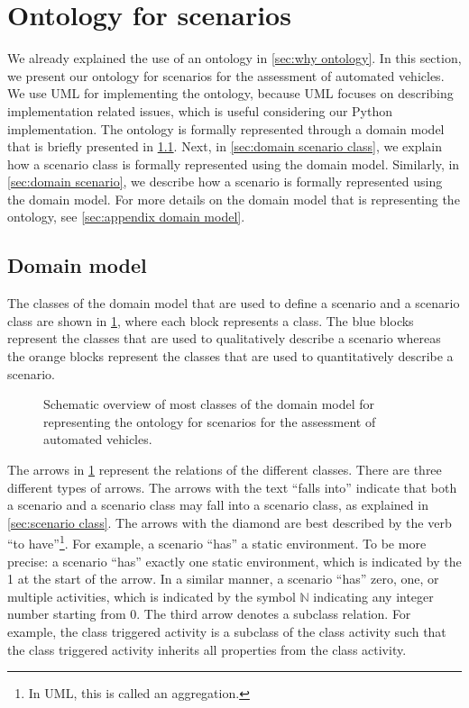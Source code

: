\section{Ontology for scenarios}
\label{sec:ontology}

We already explained the use of an ontology in \cref{sec:why ontology}. In this section, we present our ontology for scenarios for the assessment of automated vehicles. 
We use UML for implementing the ontology, because UML focuses on describing implementation related issues, which is useful considering our Python implementation.
The ontology is formally represented through a domain model that is briefly presented in \cref{sec:domain model}. Next, in \cref{sec:domain scenario class}, we explain how a scenario class is formally represented using the domain model. Similarly, in \cref{sec:domain scenario}, we describe how a scenario is formally represented using the domain model. For more details on the domain model that is representing the ontology, see \cref{sec:appendix domain model}.



\subsection{Domain model}
\label{sec:domain model}

The classes of the domain model that are used to define a scenario and a scenario class are shown in \cref{fig:ontology classes}, where each block represents a class. The blue blocks represent the classes that are used to qualitatively describe a scenario whereas the orange blocks represent the classes that are used to quantitatively describe a scenario. 

\begin{figure}
	\centering
	
	\caption{Schematic overview of most classes of the domain model for representing the ontology for scenarios for the assessment of automated vehicles.}
	\label{fig:ontology classes}
\end{figure}

The arrows in \cref{fig:ontology classes} represent the relations of the different classes. There are three different types of arrows. The arrows with the text ``falls into'' indicate that both a scenario and a scenario class may fall into a scenario class, as explained in \cref{sec:scenario class}. The arrows with the diamond are best described by the verb ``to have''\footnote{In UML, this is called an aggregation.}. For example, a scenario ``has'' a static environment. To be more precise: a scenario ``has'' exactly one static environment, which is indicated by the 1 at the start of the arrow. In a similar manner, a scenario ``has'' zero, one, or multiple activities, which is indicated by the symbol $\mathbb{N}$ indicating any integer number starting from 0. The third arrow denotes a subclass relation. For example, the class triggered activity is a subclass of the class activity such that the class triggered activity inherits all properties from the class activity.



